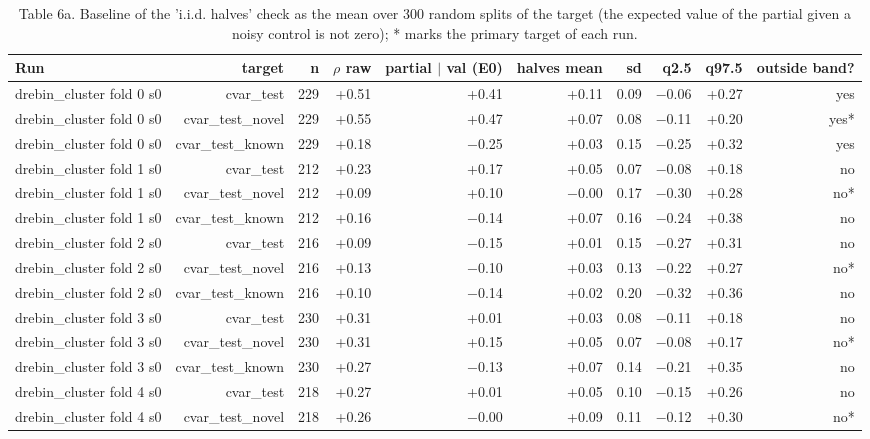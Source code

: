 \begin{table}[t]
\centering\small
\caption{Table 6a. Baseline of the 'i.i.d. halves' check as the mean over 300 random splits of the target (the expected value of the partial given a noisy control is not zero); * marks the primary target of each run.}
\label{tab:halves}
\begin{tabular}{lrrrrrrrrr}
\toprule
Run & target & n & $\rho$ raw & partial $\mid$ val (E0) & halves mean & sd & q2.5 & q97.5 & outside band? \\
\midrule
drebin\_cluster fold 0 s0 & cvar\_test & 229 & +0.51 & +0.41 & +0.11 & 0.09 & $-$0.06 & +0.27 & yes \\
drebin\_cluster fold 0 s0 & cvar\_test\_novel & 229 & +0.55 & +0.47 & +0.07 & 0.08 & $-$0.11 & +0.20 & yes* \\
drebin\_cluster fold 0 s0 & cvar\_test\_known & 229 & +0.18 & $-$0.25 & +0.03 & 0.15 & $-$0.25 & +0.32 & yes \\
drebin\_cluster fold 1 s0 & cvar\_test & 212 & +0.23 & +0.17 & +0.05 & 0.07 & $-$0.08 & +0.18 & no \\
drebin\_cluster fold 1 s0 & cvar\_test\_novel & 212 & +0.09 & +0.10 & $-$0.00 & 0.17 & $-$0.30 & +0.28 & no* \\
drebin\_cluster fold 1 s0 & cvar\_test\_known & 212 & +0.16 & $-$0.14 & +0.07 & 0.16 & $-$0.24 & +0.38 & no \\
drebin\_cluster fold 2 s0 & cvar\_test & 216 & +0.09 & $-$0.15 & +0.01 & 0.15 & $-$0.27 & +0.31 & no \\
drebin\_cluster fold 2 s0 & cvar\_test\_novel & 216 & +0.13 & $-$0.10 & +0.03 & 0.13 & $-$0.22 & +0.27 & no* \\
drebin\_cluster fold 2 s0 & cvar\_test\_known & 216 & +0.10 & $-$0.14 & +0.02 & 0.20 & $-$0.32 & +0.36 & no \\
drebin\_cluster fold 3 s0 & cvar\_test & 230 & +0.31 & +0.01 & +0.03 & 0.08 & $-$0.11 & +0.18 & no \\
drebin\_cluster fold 3 s0 & cvar\_test\_novel & 230 & +0.31 & +0.15 & +0.05 & 0.07 & $-$0.08 & +0.17 & no* \\
drebin\_cluster fold 3 s0 & cvar\_test\_known & 230 & +0.27 & $-$0.13 & +0.07 & 0.14 & $-$0.21 & +0.35 & no \\
drebin\_cluster fold 4 s0 & cvar\_test & 218 & +0.27 & +0.01 & +0.05 & 0.10 & $-$0.15 & +0.26 & no \\
drebin\_cluster fold 4 s0 & cvar\_test\_novel & 218 & +0.26 & $-$0.00 & +0.09 & 0.11 & $-$0.12 & +0.30 & no* \\

\end{tabular}
\end{table}
